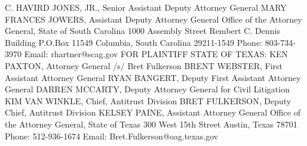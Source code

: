 \documentclass[11pt,b5paper,headings=small]{scrartcl}
\begin{document}
C. HAVIRD JONES, JR., Senior Assistant Deputy Attorney General
MARY FRANCES JOWERS, Assistant Deputy Attorney General
Office of the Attorney General, State of South Carolina
1000 Assembly Street
Rembert C. Dennis Building
P.O.Box 11549
Columbia, South Carolina 29211-1549
Phone: 803-734-3970
Email: rhartner@scag.gov
FOR PLAINTIFF STATE OF TEXAS:
KEN PAXTON, Attorney General
/s/ Bret Fulkerson
BRENT WEBSTER, First Assistant Attorney General
RYAN BANGERT, Deputy First Assistant Attorney General
DARREN MCCARTY, Deputy Attorney General for Civil Litigation
KIM VAN WINKLE, Chief, Antitrust Division
BRET FULKERSON, Deputy Chief, Antitrust Division
KELSEY PAINE, Assistant Attorney General
Office of the Attorney General, State of Texas
300 West 15th Street
Austin, Texas 78701
Phone: 512-936-1674
Email: Bret.Fulkerson@oag.texas.gov
\fi
\end{document}
